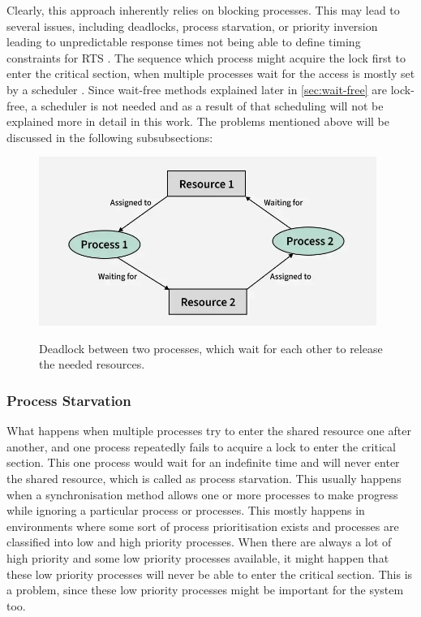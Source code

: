 Clearly, this approach inherently relies on blocking processes. This may lead to several issues, including deadlocks, process starvation, or priority inversion leading to unpredictable response times not being able to define timing constraints for \ac{RTS} \cite{brandenburg2019multiprocessorrealtimelockingprotocols}. The sequence which process might acquire the lock first to enter the critical section, when multiple processes wait for the access is mostly set by a scheduler \cite{brandenburg2019multiprocessorrealtimelockingprotocols}. Since wait-free methods explained later in \cref{sec:wait-free} are lock-free, a scheduler is not needed and as a result of that scheduling will not be explained more in detail in this work. The problems mentioned above will be discussed in the following subsubsections:

\begin{figure}[!ht]
    \centering
    \captionsetup{justification=centering}
    \caption{Deadlock between two processes, which wait for each other to release the needed resources.}
    \includegraphics[width=110mm]{images/deadlock.png}
    \cite{Deadlock}
    \label{fig:deadlock}
\end{figure}

\subsubsection{Process Starvation}\label{subsubsec:process-starvation}

What happens when multiple processes try to enter the shared resource one after another, and one process repeatedly fails to acquire a lock to enter the critical section. This one  process would wait for an indefinite time and will never enter the shared resource, which is called as process starvation. This usually happens when a synchronisation method allows one or more processes to make progress while ignoring a particular process or processes. This mostly happens in environments where some sort of process prioritisation exists and processes are classified into low and high priority processes. When there are always a lot of high priority and some low priority processes available, it might happen that these low priority processes will never be able to enter the critical section. This is a problem, since these low priority processes might be important for the system too. \cite{Starvation}

